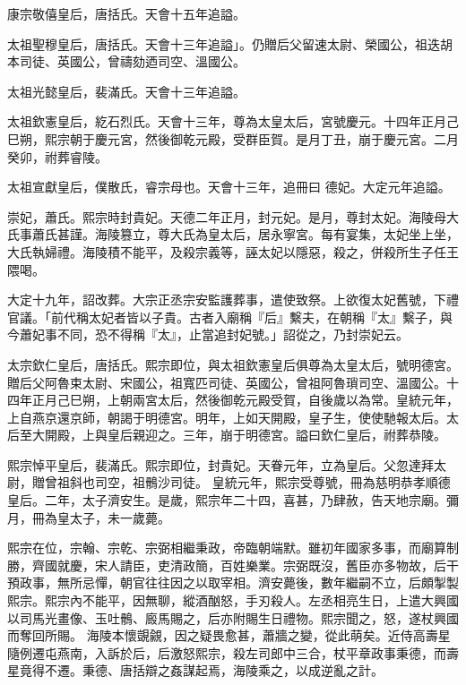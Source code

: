\begin{pinyinscope}
 康宗敬僖皇后，唐括氏。天會十五年追謚。



 太祖聖穆皇后，唐括氏。天會十三年追謚」。仍贈后父留速太尉、榮國公，祖迭胡本司徒、英國公，曾禱劾迺司空、溫國公。



 太祖光懿皇后，裴滿氏。天會十三年追謚。



 太祖欽憲皇后，紇石烈氏。天會十三年，尊為太皇太后，宮號慶元。十四年正月己巳朔，熙宗朝于慶元宮，然後御乾元殿，受群臣賀。是月丁丑，崩于慶元宮。二月癸卯，祔葬睿陵。



 太祖宣獻皇后，僕散氏，睿宗母也。天會十三年，追冊曰
 德妃。大定元年追謚。



 崇妃，蕭氏。熙宗時封貴妃。天德二年正月，封元妃。是月，尊封太妃。海陵母大氏事蕭氏甚謹。海陵篡立，尊大氏為皇太后，居永寧宮。每有宴集，太妃坐上坐，大氏執婦禮。海陵積不能平，及殺宗義等，誣太妃以隱惡，殺之，併殺所生子任王隈喝。



 大定十九年，詔改葬。大宗正丞宗安監護葬事，遣使致祭。上欲復太妃舊號，下禮官議。「前代稱太妃者皆以子貴。古者入廟稱『后』繫夫，在朝稱『太』繫子，與今蕭妃事不同，恐不得稱『太』，止當追封妃號。」詔從之，乃封崇妃云。



 太宗欽仁皇后，唐括氏。熙宗即位，與太祖欽憲皇后俱尊為太皇太后，號明德宮。贈后父阿魯束太尉、宋國公，祖寬匹司徒、英國公，曾祖阿魯瑣司空、溫國公。十四年正月己巳朔，上朝兩宮太后，然後御乾元殿受賀，自後歲以為常。皇統元年，上自燕京還京師，朝謁于明德宮。明年，上如天開殿，皇子生，使使馳報太后。太后至大開殿，上與皇后親迎之。三年，崩于明德宮。謚曰欽仁皇后，祔葬恭陵。



 熙宗悼平皇后，裴滿氏。熙宗即位，封貴妃。天眷元年，立為皇后。父忽達拜太尉，贈曾祖斜也司空，祖鶻沙司徒。
 皇統元年，熙宗受尊號，冊為慈明恭孝順德皇后。二年，太子濟安生。是歲，熙宗年二十四，喜甚，乃肆赦，告天地宗廟。彌月，冊為皇太子，未一歲薨。



 熙宗在位，宗翰、宗乾、宗弼相繼秉政，帝臨朝端默。雖初年國家多事，而廟算制勝，齊國就慶，宋人請臣，吏清政簡，百姓樂業。宗弼既沒，舊臣亦多物故，后干預政事，無所忌憚，朝官往往因之以取宰相。濟安薨後，數年繼嗣不立，后頗掣製熙宗。熙宗內不能平，因無聊，縱酒酗怒，手刃殺人。左丞相亮生日，上遣大興國以司馬光畫像、玉吐鶻、廄馬賜之，后亦附賜生日禮物。熙宗聞之，怒，遂杖興國而奪回所賜。
 海陵本懷覬覦，因之疑畏愈甚，蕭牆之變，從此萌矣。近侍高壽星隨例遷屯燕南，入訴於后，后激怒熙宗，殺左司郎中三合，杖平章政事秉德，而壽星竟得不遷。秉德、唐括辯之姦謀起焉，海陵乘之，以成逆亂之計。




\end{pinyinscope}
